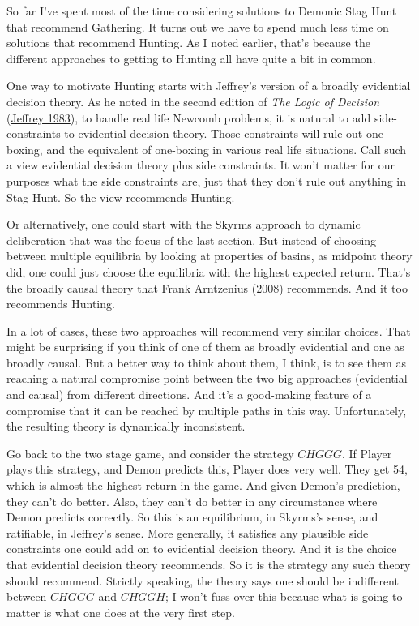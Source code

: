 \documentclass[
  12pt,
]{article}
\begin{document}
So far I've spent most of the time considering solutions to Demonic Stag
Hunt that recommend Gathering. It turns out we have to spend much less
time on solutions that recommend Hunting. As I noted earlier, that's
because the different approaches to getting to Hunting all have quite a
bit in common.

One way to motivate Hunting starts with Jeffrey's version of a broadly
evidential decision theory. As he noted in the second edition of
\emph{The Logic of Decision}
(\protect\hyperlink{ref-Jeffrey1983}{Jeffrey 1983}), to handle real life
Newcomb problems, it is natural to add side-constraints to evidential
decision theory. Those constraints will rule out one-boxing, and the
equivalent of one-boxing in various real life situations. Call such a
view evidential decision theory plus side constraints. It won't matter
for our purposes what the side constraints are, just that they don't
rule out anything in Stag Hunt. So the view recommends Hunting.

Or alternatively, one could start with the Skyrms approach to dynamic
deliberation that was the focus of the last section. But instead of
choosing between multiple equilibria by looking at properties of basins,
as midpoint theory did, one could just choose the equilibria with the
highest expected return. That's the broadly causal theory that Frank
\protect\hyperlink{ref-Arntzenius2008}{Arntzenius}
(\protect\hyperlink{ref-Arntzenius2008}{2008}) recommends. And it too
recommends Hunting.

In a lot of cases, these two approaches will recommend very similar
choices. That might be surprising if you think of one of them as broadly
evidential and one as broadly causal. But a better way to think about
them, I think, is to see them as reaching a natural compromise point
between the two big approaches (evidential and causal) from different
directions. And it's a good-making feature of a compromise that it can
be reached by multiple paths in this way. Unfortunately, the resulting
theory is dynamically inconsistent.

Go back to the two stage game, and consider the strategy \(CHGGG\). If
Player plays this strategy, and Demon predicts this, Player does very
well. They get 54, which is almost the highest return in the game. And
given Demon's prediction, they can't do better. Also, they can't do
better in any circumstance where Demon predicts correctly. So this is an
equilibrium, in Skyrms's sense, and ratifiable, in Jeffrey's sense. More
generally, it satisfies any plausible side constraints one could add on
to evidential decision theory. And it is the choice that evidential
decision theory recommends. So it is the strategy any such theory should
recommend. Strictly speaking, the theory says one should be indifferent
between \(CHGGG\) and \(CHGGH\); I won't fuss over this because what is
going to matter is what one does at the very first step.
\end{document}
